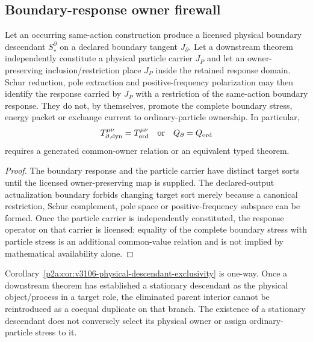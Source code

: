 \documentclass[12pt,a4paper]{article}
\begin{document}
\subsection{Boundary-response owner firewall}
\label{p2a:sec:v3107-boundary-response-owner-firewall}

\begin{corollary}
\label{p2a:cor:v3107-boundary-response-owner-firewall}
Let an occurring same-action construction produce a licensed physical boundary
descendant $S_\star^\partial$ on a declared boundary tangent $J_\partial$.
Let a downstream theorem independently constitute a physical particle carrier
$J_P$ and let an owner-preserving inclusion/restriction place $J_P$ inside the
retained response domain.  Schur reduction, pole extraction and
positive-frequency polarization may then identify the response carried by
$J_P$ with a restriction of the same-action boundary response.  They do not,
by themselves, promote the complete boundary stress, energy packet or exchange
current to ordinary-particle ownership.  In particular,
\[
 T_{\partial,\mathrm{dyn}}^{\mu\nu}=T_{\rm ord}^{\mu\nu}
 \quad\text{or}\quad
 Q_\partial=Q_{\rm ord}
\]
requires a generated common-owner relation or an equivalent typed theorem.
\end{corollary}

\begin{proof}
The boundary response and the particle carrier have distinct target sorts until
the licensed owner-preserving map is supplied.  The declared-output
actualization boundary forbids changing target sort merely because a canonical
restriction, Schur complement, pole space or positive-frequency subspace can be
formed.  Once the particle carrier is independently constituted, the response
operator on that carrier is licensed; equality of the complete boundary stress
with particle stress is an additional common-value relation and is not implied
by mathematical availability alone.
\end{proof}

\begin{remark}
\label{p2a:rem:v3107-descendant-exclusivity-direction}
Corollary~\ref{p2a:cor:v3106-physical-descendant-exclusivity} is one-way.  Once
a downstream theorem has established a stationary descendant as the physical
object/process in a target role, the eliminated parent interior cannot be
reintroduced as a coequal duplicate on that branch.  The existence of a
stationary descendant does not conversely select its physical owner or assign
ordinary-particle stress to it.
\end{remark}
\end{document}
